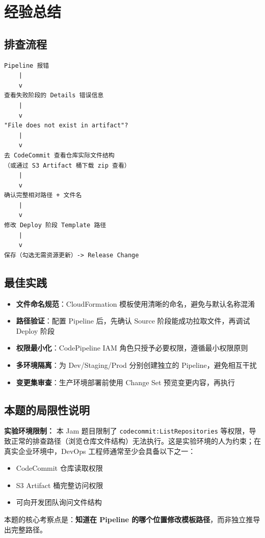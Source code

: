\documentclass[12pt, a4paper]{article}
\begin{document}
\newpage

\section{经验总结}

\subsection{排查流程}

\begin{lstlisting}
Pipeline 报错
    |
    v
查看失败阶段的 Details 错误信息
    |
    v
"File does not exist in artifact"?
    |
    v
去 CodeCommit 查看仓库实际文件结构
（或通过 S3 Artifact 桶下载 zip 查看）
    |
    v
确认完整相对路径 + 文件名
    |
    v
修改 Deploy 阶段 Template 路径
    |
    v
保存（勾选无需资源更新）-> Release Change
\end{lstlisting}

\subsection{最佳实践}

\begin{itemize}[leftmargin=2em]
  \item \textbf{文件命名规范}：CloudFormation 模板使用清晰的命名，避免与默认名称混淆
  \item \textbf{路径验证}：配置 Pipeline 后，先确认 Source 阶段能成功拉取文件，再调试 Deploy 阶段
  \item \textbf{权限最小化}：CodePipeline IAM 角色只授予必要权限，遵循最小权限原则
  \item \textbf{多环境隔离}：为 Dev/Staging/Prod 分别创建独立的 Pipeline，避免相互干扰
  \item \textbf{变更集审查}：生产环境部署前使用 Change Set 预览变更内容，再执行
\end{itemize}

\subsection{本题的局限性说明}

\begin{warnbox}
\textbf{实验环境限制：} 本 Jam 题目限制了 \texttt{codecommit:ListRepositories} 等权限，导致正常的排查路径（浏览仓库文件结构）无法执行。这是实验环境的人为约束；在真实企业环境中，DevOps 工程师通常至少会具备以下之一：
\begin{itemize}
  \item CodeCommit 仓库读取权限
  \item S3 Artifact 桶完整访问权限
  \item 可向开发团队询问文件结构
\end{itemize}
本题的核心考察点是：\textbf{知道在 Pipeline 的哪个位置修改模板路径}，而非独立推导出完整路径。
\end{warnbox}
\end{document}
